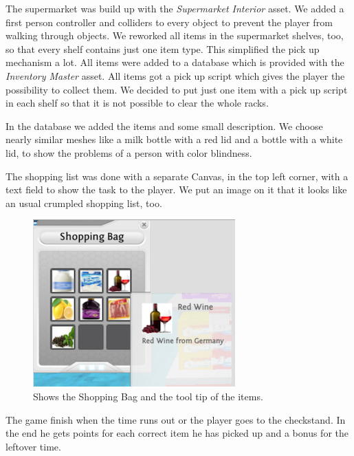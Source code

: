 \documentclass{sig-alternate-05-2015}
\begin{document}
The supermarket was build up with the \emph{Supermarket Interior} asset.
We added a first person controller and colliders to every object to prevent the player from walking through objects.
We reworked all items in the supermarket shelves, too, so that every shelf contains just one item type.
This simplified the pick up mechanism a lot.
All items were added to a database which is provided with the \emph{Inventory Master} asset.
All items got a pick up script which gives the player the possibility to collect them.
We decided to put just one item with a pick up script in each shelf so that it is not possible to clear the whole racks.

In the database we added the items and some small description.
We choose nearly similar meshes like a milk bottle with a red lid and a bottle with a white lid, to show the problems of a person with color blindness.

The shopping list was done with a separate Canvas, in the top left corner, with a text field to show the task to the player.
We put an image on it that it looks like an usual crumpled shopping list, too.
%
\begin{figure}
    \centering
    \includegraphics[width=\columnwidth]{ShoppingBag.png}
    \caption{Shows the Shopping Bag and the tool tip of the items.}
    \label{fig:ShoppingBag}
\end{figure}
%
The game finish when the time runs out or the player goes to the checkstand.
In the end he gets points for each correct item he has picked up and a bonus for the leftover time.
\end{document}
